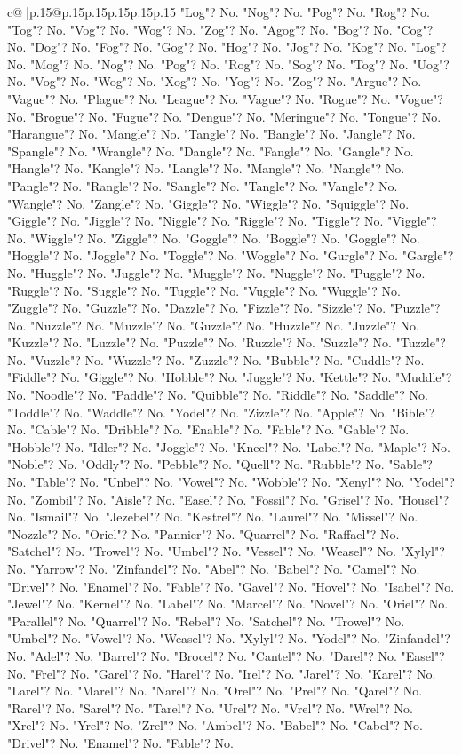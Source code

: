 \documentclass{article}
\begin{document}
{\begin{supertabular}{c@{$\;$}|p{.15\linewidth}@{}p{.15\linewidth}p{.15\linewidth}p{.15\linewidth}p{.15\linewidth}p{.15\linewidth}}
{{{"Log"? No. "Nog"? No. "Pog"? No. "Rog"? No. "Tog"? No. "Vog"? No. "Wog"? No. "Zog"? No. "Agog"? No. "Bog"? No. "Cog"? No. "Dog"? No. "Fog"? No. "Gog"? No. "Hog"? No. "Jog"? No. "Kog"? No. "Log"? No. "Mog"? No. "Nog"? No. "Pog"? No. "Rog"? No. "Sog"? No. "Tog"? No. "Uog"? No. "Vog"? No. "Wog"? No. "Xog"? No. "Yog"? No. "Zog"? No. "Argue"? No. "Vague"? No. "Plague"? No. "League"? No. "Vague"? No. "Rogue"? No. "Vogue"? No. "Brogue"? No. "Fugue"? No. "Dengue"? No. "Meringue"? No. "Tongue"? No. "Harangue"? No. "Mangle"? No. "Tangle"? No. "Bangle"? No. "Jangle"? No. "Spangle"? No. "Wrangle"? No. "Dangle"? No. "Fangle"? No. "Gangle"? No. "Hangle"? No. "Kangle"? No. "Langle"? No. "Mangle"? No. "Nangle"? No. "Pangle"? No. "Rangle"? No. "Sangle"? No. "Tangle"? No. "Vangle"? No. "Wangle"? No. "Zangle"? No. "Giggle"? No. "Wiggle"? No. "Squiggle"? No. "Giggle"? No. "Jiggle"? No. "Niggle"? No. "Riggle"? No. "Tiggle"? No. "Viggle"? No. "Wiggle"? No. "Ziggle"? No. "Goggle"? No. "Boggle"? No. "Goggle"? No. "Hoggle"? No. "Joggle"? No. "Toggle"? No. "Woggle"? No. "Gurgle"? No. "Gargle"? No. "Huggle"? No. "Juggle"? No. "Muggle"? No. "Nuggle"? No. "Puggle"? No. "Ruggle"? No. "Suggle"? No. "Tuggle"? No. "Vuggle"? No. "Wuggle"? No. "Zuggle"? No. "Guzzle"? No. "Dazzle"? No. "Fizzle"? No. "Sizzle"? No. "Puzzle"? No. "Nuzzle"? No. "Muzzle"? No. "Guzzle"? No. "Huzzle"? No. "Juzzle"? No. "Kuzzle"? No. "Luzzle"? No. "Puzzle"? No. "Ruzzle"? No. "Suzzle"? No. "Tuzzle"? No. "Vuzzle"? No. "Wuzzle"? No. "Zuzzle"? No. "Bubble"? No. "Cuddle"? No. "Fiddle"? No. "Giggle"? No. "Hobble"? No. "Juggle"? No. "Kettle"? No. "Muddle"? No. "Noodle"? No. "Paddle"? No. "Quibble"? No. "Riddle"? No. "Saddle"? No. "Toddle"? No. "Waddle"? No. "Yodel"? No. "Zizzle"? No. "Apple"? No. "Bible"? No. "Cable"? No. "Dribble"? No. "Enable"? No. "Fable"? No. "Gable"? No. "Hobble"? No. "Idler"? No. "Joggle"? No. "Kneel"? No. "Label"? No. "Maple"? No. "Noble"? No. "Oddly"? No. "Pebble"? No. "Quell"? No. "Rubble"? No. "Sable"? No. "Table"? No. "Unbel"? No. "Vowel"? No. "Wobble"? No. "Xenyl"? No. "Yodel"? No. "Zombil"? No. "Aisle"? No. "Easel"? No. "Fossil"? No. "Grisel"? No. "Housel"? No. "Ismail"? No. "Jezebel"? No. "Kestrel"? No. "Laurel"? No. "Missel"? No. "Nozzle"? No. "Oriel"? No. "Pannier"? No. "Quarrel"? No. "Raffael"? No. "Satchel"? No. "Trowel"? No. "Umbel"? No. "Vessel"? No. "Weasel"? No. "Xylyl"? No. "Yarrow"? No. "Zinfandel"? No. "Abel"? No. "Babel"? No. "Camel"? No. "Drivel"? No. "Enamel"? No. "Fable"? No. "Gavel"? No. "Hovel"? No. "Isabel"? No. "Jewel"? No. "Kernel"? No. "Label"? No. "Marcel"? No. "Novel"? No. "Oriel"? No. "Parallel"? No. "Quarrel"? No. "Rebel"? No. "Satchel"? No. "Trowel"? No. "Umbel"? No. "Vowel"? No. "Weasel"? No. "Xylyl"? No. "Yodel"? No. "Zinfandel"? No. "Adel"? No. "Barrel"? No. "Brocel"? No. "Cantel"? No. "Darel"? No. "Easel"? No. "Frel"? No. "Garel"? No. "Harel"? No. "Irel"? No. "Jarel"? No. "Karel"? No. "Larel"? No. "Marel"? No. "Narel"? No. "Orel"? No. "Prel"? No. "Qarel"? No. "Rarel"? No. "Sarel"? No. "Tarel"? No. "Urel"? No. "Vrel"? No. "Wrel"? No. "Xrel"? No. "Yrel"? No. "Zrel"? No. "Ambel"? No. "Babel"? No. "Cabel"? No. "Drivel"? No. "Enamel"? No. "Fable"? No. }}}
\end{supertabular}}
\end{document}
